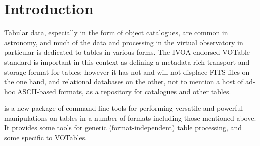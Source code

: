 \documentclass[11pt,twoside]{article}  %
\begin{document}
%
%

\section{Introduction}

Tabular data, especially in the form of object catalogues, 
are common in astronomy, and much of the data and processing 
in the virtual observatory in particular is dedicated to tables
in various forms.  The IVOA-endorsed VOTable standard is important
in this context as defining a metadata-rich transport and storage 
format for tables; however it has not and will not displace
FITS files on the one hand, and relational databases on the
other, not to mention a host of ad-hoc ASCII-based formats,
as a repository for catalogues and other tables.

is a new package of command-line tools for performing versatile
and powerful manipulations on tables in a number of formats including
those mentioned above.
It provides some tools for generic (format-independent) table
processing, and some specific to VOTables.
\end{document}
